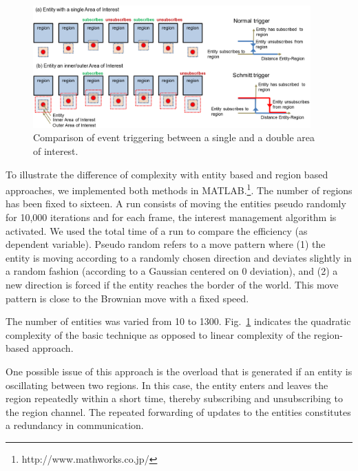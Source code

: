 \documentclass[]{elsarticle}
\begin{document}
\begin{figure}[t]
\centering
\includegraphics[width=0.95\textwidth]{acm-vrst13-img/hysteresis_description.png}
\caption{Comparison of event triggering between a single and a double area of interest.}
\label{fig:double_threshold}
\end{figure}

To illustrate the difference of complexity with entity based and region based approaches, we implemented both methods in MATLAB.\footnote{http://www.mathworks.co.jp/}.
The number of regions has been fixed to sixteen.
A run consists of moving the entities pseudo randomly for 10,000 iterations and for each frame, the interest management algorithm is activated. We used the total time of a run to compare the efficiency (as dependent variable). Pseudo random refers to a move pattern where (1) the entity is moving according to a randomly chosen direction and deviates slightly in a random fashion (according to a Gaussian centered on 0 deviation), and (2) a new direction is forced if the entity reaches the border of the world. This move pattern is close to the Brownian move with a fixed speed.

The number of entities was varied from 10 to 1300. Fig.~\ref{fig:double_threshold} indicates the quadratic complexity of the basic technique as opposed to linear complexity of the region-based approach.

One possible issue of this approach is the overload that is generated if an entity is oscillating between two regions. In this case, the entity enters and leaves the region repeatedly within a short time, thereby subscribing and unsubscribing to the region channel. The repeated forwarding of updates to the entities constitutes a redundancy in communication.
\end{document}
